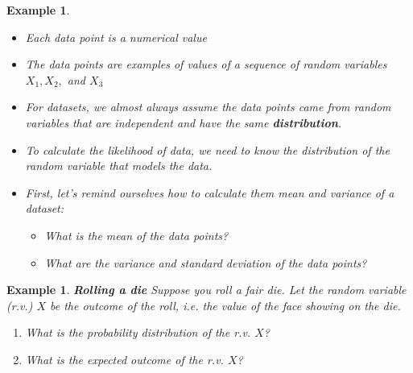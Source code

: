 \documentclass[12pt]{amsart}
\newtheorem{example}[theorem]{Example}
\begin{document}
{\begin{example}
\begin{itemize}
\item Each data point is a numerical value
\item The data points are examples of values of a sequence of random variables $X_1, X_2,$ and $X_3$
\item For datasets, we almost always assume the data points came from random variables that are independent and have the same \textbf{distribution}. 
\item To calculate the likelihood of data, we need to know the distribution of the random variable that models the data.

\item First, let's remind ourselves how to calculate them mean and variance of a dataset:
	\begin{itemize}
	\item What is the mean of the data points?

\vspace{2cm}
	\item What are the variance and standard deviation of the data points?


	\end{itemize}


\end{itemize}
\end{example} 

\newpage



\begin{example}  \textbf{Rolling a die} \newline
Suppose you roll a fair die. Let the random variable (r.v.) $X$ be the outcome of the roll, i.e. the value of the face showing on the die. 

\begin{enumerate}
\item What is the probability distribution of the r.v. $X$?
\vspace{3cm}

\item  What is the expected outcome of the r.v. $X$?



\vspace{5cm}


\end{enumerate}
\end{example}}
\end{document}
